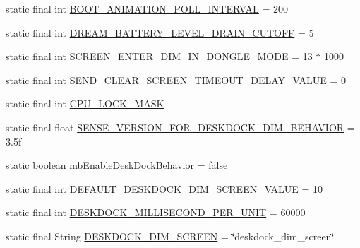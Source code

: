 \begin{DoxyCompactItemize}
\item 
static final int \hyperlink{classcom_1_1android_1_1server_1_1power_1_1PowerManagerService_a77f8e0d5fb001942db81f286173b2b30}{B\-O\-O\-T\-\_\-\-A\-N\-I\-M\-A\-T\-I\-O\-N\-\_\-\-P\-O\-L\-L\-\_\-\-I\-N\-T\-E\-R\-V\-A\-L} = 200
\item 
static final int \hyperlink{classcom_1_1android_1_1server_1_1power_1_1PowerManagerService_ab37201c7b4e9d816c67dd14763ed8725}{D\-R\-E\-A\-M\-\_\-\-B\-A\-T\-T\-E\-R\-Y\-\_\-\-L\-E\-V\-E\-L\-\_\-\-D\-R\-A\-I\-N\-\_\-\-C\-U\-T\-O\-F\-F} = 5
\item 
static final int \hyperlink{classcom_1_1android_1_1server_1_1power_1_1PowerManagerService_aaf0d21b2acf3bf8b543c48f08a2d086d}{S\-C\-R\-E\-E\-N\-\_\-\-E\-N\-T\-E\-R\-\_\-\-D\-I\-M\-\_\-\-I\-N\-\_\-\-D\-O\-N\-G\-L\-E\-\_\-\-M\-O\-D\-E} = 13 $\ast$ 1000
\item 
static final int \hyperlink{classcom_1_1android_1_1server_1_1power_1_1PowerManagerService_a85b19c9d3ddb9d3bd836ad156b97e5d8}{S\-E\-N\-D\-\_\-\-C\-L\-E\-A\-R\-\_\-\-S\-C\-R\-E\-E\-N\-\_\-\-T\-I\-M\-E\-O\-U\-T\-\_\-\-D\-E\-L\-A\-Y\-\_\-\-V\-A\-L\-U\-E} = 0
\item 
static final int \hyperlink{classcom_1_1android_1_1server_1_1power_1_1PowerManagerService_a5137d6e2a25197ab15aad0175b256b28}{C\-P\-U\-\_\-\-L\-O\-C\-K\-\_\-\-M\-A\-S\-K}
\item 
static final float \hyperlink{classcom_1_1android_1_1server_1_1power_1_1PowerManagerService_a447452f8df9eef5a65a2da65fd5aa371}{S\-E\-N\-S\-E\-\_\-\-V\-E\-R\-S\-I\-O\-N\-\_\-\-F\-O\-R\-\_\-\-D\-E\-S\-K\-D\-O\-C\-K\-\_\-\-D\-I\-M\-\_\-\-B\-E\-H\-A\-V\-I\-O\-R} = 3.\-5f
\item 
static boolean \hyperlink{classcom_1_1android_1_1server_1_1power_1_1PowerManagerService_a2ac9f1ce24c1ca4df89c6b13c95f6b66}{mb\-Enable\-Desk\-Dock\-Behavior} = false
\item 
static final int \hyperlink{classcom_1_1android_1_1server_1_1power_1_1PowerManagerService_a4a4f1a29864e746adcd09b9395f8c057}{D\-E\-F\-A\-U\-L\-T\-\_\-\-D\-E\-S\-K\-D\-O\-C\-K\-\_\-\-D\-I\-M\-\_\-\-S\-C\-R\-E\-E\-N\-\_\-\-V\-A\-L\-U\-E} = 10
\item 
static final int \hyperlink{classcom_1_1android_1_1server_1_1power_1_1PowerManagerService_aabc4ab35b4e83159f3b22ee58a6c3373}{D\-E\-S\-K\-D\-O\-C\-K\-\_\-\-M\-I\-L\-L\-I\-S\-E\-C\-O\-N\-D\-\_\-\-P\-E\-R\-\_\-\-U\-N\-I\-T} = 60000
\item 
static final String \hyperlink{classcom_1_1android_1_1server_1_1power_1_1PowerManagerService_a805a21a75113b995d2487ef08a37768e}{D\-E\-S\-K\-D\-O\-C\-K\-\_\-\-D\-I\-M\-\_\-\-S\-C\-R\-E\-E\-N} = \char`\"{}deskdock\-\_\-dim\-\_\-screen\char`\"{}

\end{DoxyCompactItemize}

